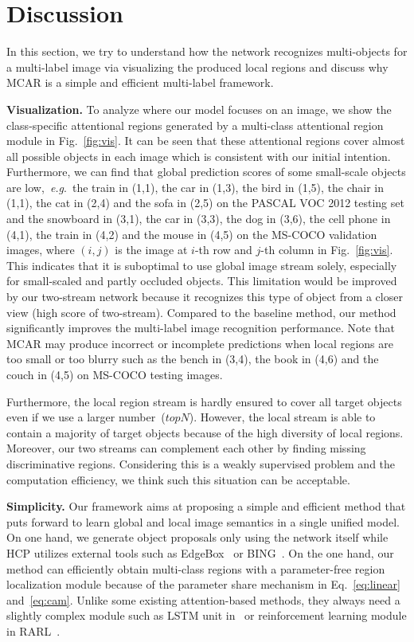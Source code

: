 \documentclass[journal]{IEEEtran}
\makeatletter
\DeclareRobustCommand\onedot{\@onedot}
\def\@onedot{.}
\def\eg{\emph{e.g}\onedot}
\makeatother
\begin{document}
\section{Discussion}\label{discuss}
In this section, we try to understand how the network recognizes multi-objects for a multi-label image via visualizing the produced local regions and discuss why MCAR is a simple and efficient multi-label framework. 

\noindent \textbf{Visualization.} 
To analyze where our model focuses on an image, we show the class-specific attentional regions generated by a multi-class attentional region module in Fig.~\ref{fig:vis}. It can be seen that these attentional regions cover almost all possible objects in each image which is consistent with our initial intention. Furthermore, we can find that global prediction scores of some small-scale objects are low,~\eg~the train in (1,1), the car in (1,3), the bird in (1,5), the chair in (1,1), the cat in (2,4) and the sofa in (2,5) on the PASCAL VOC 2012 testing set and the snowboard in (3,1), the car in (3,3), the dog in (3,6), the cell phone in (4,1), the train in (4,2) and the mouse in (4,5) on the MS-COCO validation images, where $(i,j)$ is the image at $i$-th row and $j$-th column in Fig.~\ref{fig:vis}. This indicates that it is suboptimal to use global image stream solely, especially for small-scaled and partly occluded objects. This limitation would be improved by our two-stream network because it recognizes this type of object from a closer view (high score of two-stream). Compared to the baseline method, our method significantly improves the multi-label image recognition performance. Note that MCAR may produce incorrect or incomplete predictions when local regions are too small or too blurry such as the bench in (3,4), the book in (4,6) and the couch in (4,5) on MS-COCO testing images.

Furthermore, the local region stream is hardly ensured to cover all target objects even if we use a larger number~($topN$). However, the local stream is able to contain a majority of target objects because of the high diversity of local regions. Moreover, our two streams can complement each other by finding missing discriminative regions. Considering this is a weakly supervised problem and the computation efficiency, we think such this situation can be acceptable.

\noindent \textbf{Simplicity.} 
Our framework aims at proposing a simple and efficient method that puts forward to learn global and local image semantics in a single unified model. 
On one hand, we generate object proposals only using the network itself while HCP utilizes external tools such as EdgeBox~\cite{zitnick2014edge} or BING~\cite{cheng2014bing}. On the one hand, our method can efficiently obtain multi-class regions with a parameter-free region localization module because of the parameter share mechanism in Eq.~\ref{eq:linear} and~\ref{eq:cam}. Unlike some existing attention-based methods, they always need a slightly complex module such as LSTM unit in~\cite{jaderberg2015spatial,yu2019delta} or reinforcement learning module in RARL~\cite{chen2018recurrent}.
\end{document}
